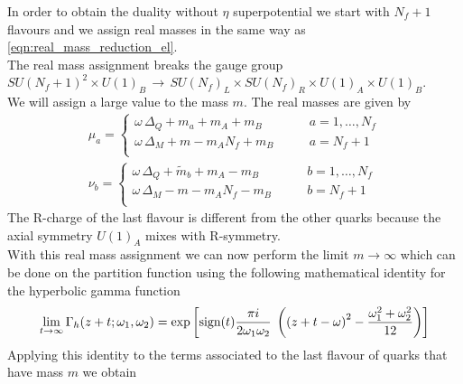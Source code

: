 In order to obtain the duality without $\eta$ superpotential we start with $N_f + 1 $ flavours and we assign real masses in the same way as \eqref{eqn:real_mass_reduction_el}. \\
The real mass assignment breaks the gauge group $ SU(N_f+1)^2 \times U(1)_B \, \rightarrow \, SU(N_f)_L \times SU(N_f)_R \times U(1)_A \times U(1)_B$. \\
We will assign a large value to the mass $m$. 
The real masses are given by
\begin{equation}
\begin{aligned}
\mu_a = 
  \begin{cases}
    \omega \, \Delta_Q + m_a + m_A + m_B \qquad  &a = 1, \dotsc, N_f\\ 
    \omega \, \Delta_M +  m - m_A N_f  + m_B \qquad  &a = N_f+1\\ 
  \end{cases}
  \\
\nu_b = 
  \begin{cases}
    \omega \, \Delta_Q + \tilde{m}_b + m_A - m_B \qquad  &b = 1, \dotsc, N_f\\ 
    \omega \, \Delta_M - m - m_A N_f  - m_B \qquad  &b = N_f+1\\ 
  \end{cases}
\end{aligned}
\end{equation}
The R-charge of the last flavour is different from the other quarks because the axial symmetry $U(1)_A$ mixes with R-symmetry.\\
With this real mass assignment we can now perform the limit $m \rightarrow \infty$ which can be done on the partition function using the following mathematical identity for the hyperbolic gamma function \cite{vanDeBult:2007}
\begin{equation}
 \lim_{ t \rightarrow \infty } \Gamma_h ( z + t; \omega_1, \omega_2) = 
\exp \left[ 
 \hbox{sign}(t) \frac{\pi i}{2 \omega_1 \omega_2}\; 
  \left(
    \left(
      z +t - \omega
    \right)^2 - \frac{\omega_1^2 + \omega_2^2}{12}
  \right)
\right]
\label{eqn:m_infinity_limit_hyperbolic}
\end{equation}
Applying this identity to the terms associated to the last flavour of quarks that have mass $m$ we obtain
